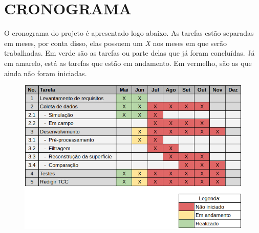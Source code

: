\chapter{CRONOGRAMA}
\label{chap:cronograma}

O cronograma do projeto é apresentado logo abaixo. As tarefas estão separadas em meses, por conta disso, elas possuem um \textit{X} nos meses em que serão trabalhadas. Em verde são as tarefas ou parte delas que já foram concluídas. Já em amarelo, está as tarefas que estão em andamento. Em vermelho, são as que ainda não foram iniciadas.

\begin{figure}[H]
    \centering
    \includegraphics[scale=0.8]{dados/figuras/cronograma.png}
\end{figure}